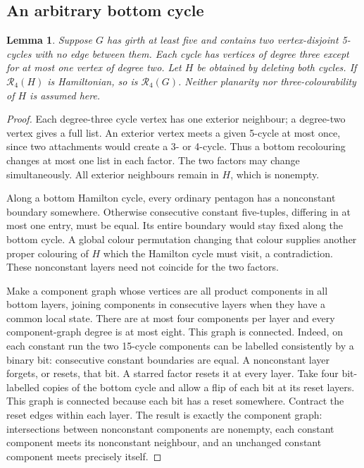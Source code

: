 \documentclass[11pt]{article}
\newtheorem{lemma}[theorem]{Lemma}
\theoremstyle{remark}
\newcommand{\R}{\mathcal R}
\numberwithin{equation}{section}
\numberwithin{table}{section}
\begin{document}
\subsection{An arbitrary bottom cycle}
\begin{lemma}\label{lem:two-pentagons-restore}
Suppose $G$ has girth at least five and contains two vertex-disjoint
5-cycles with no edge between them. Each cycle has vertices of degree
three except for at most one vertex of degree two.
Let $H$ be obtained by deleting both cycles. If $\R_4(H)$ is
Hamiltonian, so is $\R_4(G)$.
Neither planarity nor three-colourability of $H$ is assumed here.
\end{lemma}
\begin{proof}
Each degree-three cycle vertex has one exterior neighbour; a
degree-two vertex gives a full list. An exterior vertex meets a
given 5-cycle at most once, since two attachments would create a
3- or 4-cycle. Thus a bottom recolouring changes at most one list
in each factor. The two factors may change simultaneously.
All exterior neighbours remain in $H$, which is nonempty.

Along a bottom Hamilton cycle, every ordinary pentagon has a
nonconstant boundary somewhere. Otherwise consecutive constant
five-tuples, differing in at most one entry, must be equal.
Its entire boundary would stay fixed along the bottom cycle.
A global colour permutation changing that colour supplies another
proper colouring of $H$ which the Hamilton cycle must visit,
a contradiction. These nonconstant layers need not coincide
for the two factors.

Make a component graph whose vertices are all product components
in all bottom layers, joining components in consecutive layers
when they have a common local state. There are at most four components
per layer and every component-graph degree is at most eight.
This graph is connected. Indeed, on each constant run the two
15-cycle components can be labelled consistently by a binary bit:
consecutive constant boundaries are equal. A nonconstant layer
forgets, or resets, that bit. A starred factor resets it at every layer.
Take four bit-labelled copies of the bottom cycle and allow a flip of
each bit at its reset layers. This graph is connected because each
bit has a reset somewhere. Contract the reset edges within each
layer. The result is exactly the component graph: intersections
between nonconstant components are nonempty, each constant component
meets its nonconstant neighbour, and an unchanged constant component
meets precisely itself.


\end{proof}
\end{document}
